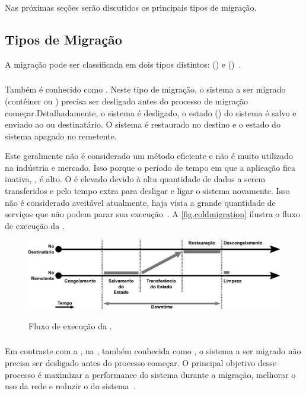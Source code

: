 Nas próximas seções serão discutidos os principais tipos de migração.

\subsection{Tipos de Migração}
A migração pode ser classificada em dois tipos distintos: \coldmigration(\nonlivemigration) e \hotmigration (\livemigration)~\cite{imran2022live}.

\subsubsection{\Coldmigration}\label{sec.coldmigration}
Também é conhecido como \nonlivemigration. Neste tipo de migração, o sistema a ser migrado (contêiner ou \vm) precisa ser desligado antes do processo de migração começar.Detalhadamente, o sistema é desligado, o estado (\checkpoint) do sistema é salvo e enviado ao \so ou \vm destinatário. O sistema é restaurado no destino e o estado do sistema apagado no remetente.

Este geralmente não é considerado um método eficiente e não é muito utilizado na indústria e mercado. Isso porque o período de tempo em que a aplicação fica inativa, \aka \downtime, é alto. O \downtime é elevado devido à alta quantidade de dados a serem transferidos e pelo tempo extra para desligar e ligar o sistema novamente. Isso não é considerado aveitável atualmente, haja vista a grande quantidade de serviços que não podem parar sua execução~\cite{singh2022predictive, imran2022live}. A \autoref{fig.coldmigration} ilustra o fluxo de execução da \coldmigration.

\begin{figure}[bt]
    \centering
    \caption{Fluxo de execução da \coldmigration.}
    \includegraphics[width=0.8\linewidth]{content/images/cold-migration-flow.pdf}
    \label{fig.coldmigration}
\end{figure}

\subsubsection{\Hotmigration}\label{sec.hotmigration}
Em contraste com a \coldmigration, na \hotmigration, também conhecida como \livemigration, o sistema a ser migrado não precisa ser desligado antes do processo começar. O principal objetivo desse processo é maximizar a performance do sistema durante a migração, melhorar o uso da rede e reduzir o \downtime do sistema~\cite{imran2022live}.

